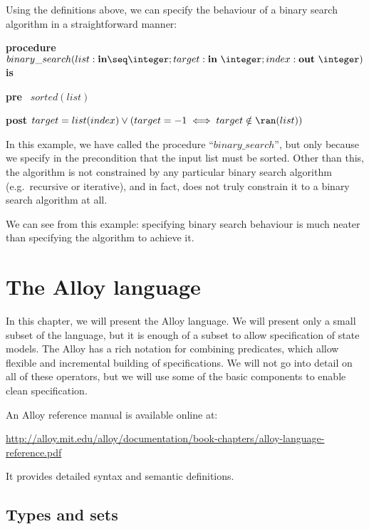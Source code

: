 \begin{example}
Using the definitions above, we can specify the behaviour of a binary search algorithm in a straightforward manner:

\textbf{procedure}  $binary\_search (list : \textbf{in} \seq \integer; target : \textbf{in}\ \integer; index : \textbf{out}\ \integer)$ \textbf{is}

\vspace{-2mm}

\quad \textbf{pre} ~$sorted(list)$

\vspace{-2mm}

\quad \textbf{post} $target = list(index) \lor (target = -1 \iff target \notin \ran(list))$

In this example, we have called the procedure ``$binary\_search$'', but only because we specify in the precondition that the input list must be sorted. Other than this, the algorithm is not constrained by any particular binary search algorithm (e.g.\ recursive or iterative), and in fact, does not truly constrain it to a binary search algorithm at all.

We can see from this example: specifying binary search behaviour is much neater than specifying the algorithm to achieve it.

\end{example}

\section{The Alloy language}

In this chapter, we will present the Alloy language. We will present only a small subset of the language, but it is enough of a subset to allow specification of state models. The Alloy has a rich notation for combining predicates, which allow flexible and incremental building of specifications. We will not go into detail on all of these operators, but we will use some of the basic components to enable clean specification.

An Alloy reference manual is available online at:

 \url{http://alloy.mit.edu/alloy/documentation/book-chapters/alloy-language-reference.pdf}

 It provides detailed syntax and semantic definitions. 

\subsection{Types and sets}

